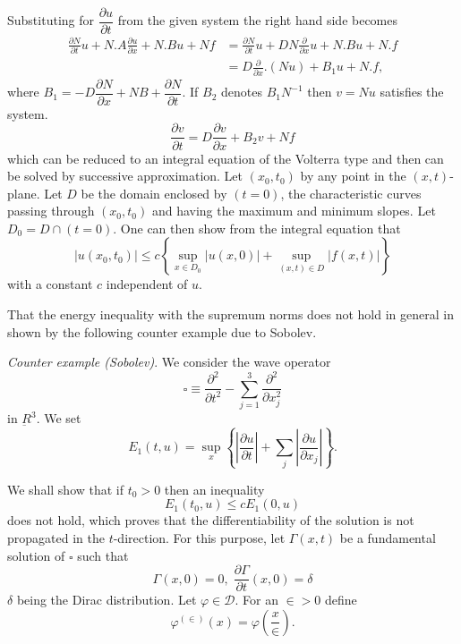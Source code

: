 Substituting for $\dfrac{\partial u}{\partial t}$ from the given
system the right hand side becomes 
\begin{align*}
\frac{\partial N}{\partial t} u + N.A \frac{\partial u}{\partial x} +
N.B u + Nf & = \frac{\partial N}{\partial t} u + DN
\frac{\partial}{\partial x} u + N.B u + N.f\\ 
& = D \frac{\partial }{\partial x}. (Nu) + B_1 u + N.f,
 \end{align*}\pageoriginale  
where $B_1 = - D \dfrac{\partial N}{\partial x} + NB +
 \dfrac{\partial N}{\partial t}$. If $B_2$ denotes $B_1 N^{-1}$ then $v
 = Nu$ satisfies the system. 
 $$
 \frac{\partial v}{\partial t} = D \frac{\partial v}{\partial x} + B_2
 v + Nf 
 $$
 which can be reduced to an integral equation of the Volterra type and
 then can be solved by successive approximation. Let $(x_0, t_0)$ by
 any point in the $(x, t)$-plane. Let $D$ be the domain enclosed by
 $(t = 0)$, the characteristic curves passing through $(x_0, t_0)$ and
 having the maximum and minimum slopes. Let $D_0 = D \cap (t =
 0)$. One can then show from the integral equation that 
 $$
 | u (x_0, t_0) |\leq c \left\{ \sup\limits_{x \in D_0} | u (x, 0) |+
 \sup\limits_{(x, t) \in D}| f (x, t) |\right\} 
 $$ 
 with a constant $c$ independent of $u$.
 
 That the energy inequality with the supremum norms does not hold in
 general in shown by the following counter example due to
 Sobolev.

\medskip
\noindent
 \textit{Counter example (Sobolev)}. We consider the wave
 operator  
 \begin{equation}
\square \equiv \frac{\partial^2}{\partial t^2} - \sum\limits^{3}_{j=1}
\frac{\partial^2}{\partial x^2_j} \tag{2.3}\label{chap3-eq2.3}
 \end{equation} 
 in $\underbar{R}^3$. We set 
 $$
 E_1 (t,u) = \sup\limits_{x} \left\{\left| \frac{\partial u}{\partial
   t}\right| + \sum_{j} \left|\frac{\partial u}{\partial x_j}\right| \right\}. 
 $$

 We shall show that if $t_0 > 0$ then an inequality
 $$
 E_1 (t_0, u) \leq c E_1 (0, u) 
 $$\pageoriginale
does not hold, which proves that the differentiability of the solution
is not propagated in the $t$-direction. For this purpose, let $\Gamma
(x, t)$ be a fundamental solution of $\square$ such that  
 $$
 \Gamma (x, 0) = 0, \; \frac{\partial \Gamma}{\partial t} (x, 0) =
 \delta   
 $$
 $\delta$ being the Dirac distribution. Let $\varphi \in
 \mathscr{D}$. For an $\in > 0$ define  
 $$
 \varphi^{(\in)} (x) = \varphi \left(\frac{x}{\in}\right). 
 $$

